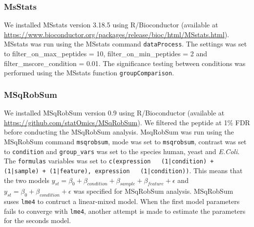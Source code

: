 \documentclass[10pt,letterpaper]{article}
\begin{document}


\subsubsection*{MsStats}

We installed MSstats version 3.18.5 using R/Bioconductor (available at \url{https://www.bioconductor.org/packages/release/bioc/html/MSstats.html}). MSstats was run using the MSstats command \texttt{dataProcess}. The settings was set to filter\_on\_max\_peptides = 10, filter\_on\_min\_peptides = 2 and filter\_mscore\_condition = 0.01. The significance testing between conditions was performed using the MSstats function \texttt{groupComparison}.  


\subsubsection*{MSqRobSum}

We installed MSqRobSum version 0.9 using R/Bioconductor (available at \url{https://github.com/statOmics/MSqRobSum}). We filtered the peptide at 1\% FDR before conducting the MSqRobSum analysis. MsqRobSum was run using the MSqRobSum command \texttt{msqrobsum}, mode was set to \texttt{msqrobsum}, contrast was set to \texttt{condition} and \texttt{group\_vars} was set to the species human, yeast and \textit{E.Coli}. The \texttt{formulas} variables was set to \texttt{c(expression ~ (1|condition) + (1|sample) + (1|feature), expression ~ (1|condition))}. This means that the two models $y_{st} = \beta_0 + \beta_{condition} + \beta_{sample} + \beta_{feature} + \epsilon$ and $y_{st} = \beta_0 + \beta_{condition} + \epsilon$ was specified for MSqRobSum analysis. MSqRobSum suses \texttt{lme4} to contruct a linear-mixed model. When the first model parameters fails to converge with \texttt{lme4}, another attempt is made to estimate the parameters for the seconds model.

\end{document}
